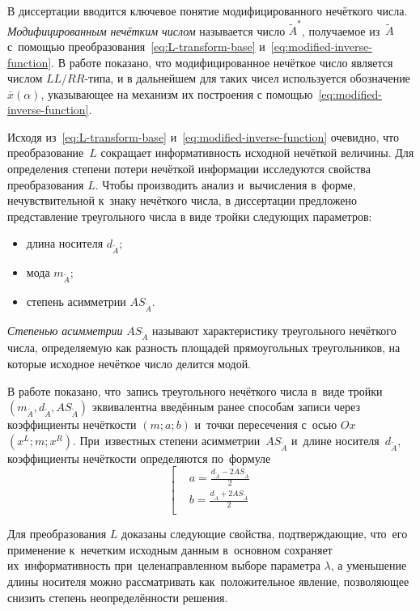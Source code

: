 В диссертации вводится ключевое понятие модифицированного нечёткого числа. \textit{Модифицированным нечётким числом} называется число $\tilde A^{*}$, получаемое из~$\tilde{A}$ с~помощью преобразования~\eqref{eq:L-transform-base} и~\eqref{eq:modified-inverse-function}. В работе показано, что модифицированное нечёткое число является числом $LL/RR$-типа, и в дальнейшем для таких чисел используется обозначение $\bar{x}\left( \alpha  \right)$, указывающее на механизм их построения с помощью~\eqref{eq:modified-inverse-function}.

Исходя из~\eqref{eq:L-transform-base} и~\eqref{eq:modified-inverse-function} очевидно, что преобразование~$L$ сокращает информативность исходной нечёткой величины. Для определения степени потери нечёткой информации исследуются свойства преобразования $L$. Чтобы производить анализ и~вычисления в~форме, нечувствительной к~знаку нечёткого числа, в диссертации предложено представление треугольного числа в виде тройки следующих параметров:
\begin{itemize}
  \item длина носителя $d_{\tilde A}$;
  \item мода $m_{\tilde A}$;
  \item степень асимметрии $AS_{\tilde A}$.
\end{itemize}

\textit{Степенью асимметрии} $AS_{\tilde A}$ называют характеристику треугольного нечёткого числа, определяемую как разность площадей прямоугольных треугольников, на которые исходное нечёткое число делится модой.

В работе показано, что~запись треугольного нечёткого числа в~виде тройки $\left(m_{\tilde A}, d_{\tilde A}, AS_{\tilde A} \right)$ эквивалентна введённым ранее способам записи через коэффициенты нечёткости $\left( m;a;b \right)$ и~точки пересечения с~осью $Ox$ $\left( x^L;m;x^R \right)$. При~известных степени асимметрии~$AS_{\tilde A}$ и~длине носителя~$d_{\tilde A}$, коэффициенты нечёткости определяются по~формуле
\begin{equation*}
	\left[ \begin{aligned}
      & a=\frac{d_{\tilde A}-2AS_{\tilde A}}{2} \\ 
      & b=\frac{d_{\tilde A}+2AS_{\tilde A}}{2} \\ 
    \end{aligned} \right.
\end{equation*}

Для преобразования $L$ доказаны следующие свойства, подтверждающие, что~его применение к~нечетким исходным данным в~основном сохраняет их~информативность при~целенаправленном выборе параметра $\lambda$, а уменьшение длины носителя можно рассматривать как~положительное явление, позволяющее снизить степень неопределённости решения.

